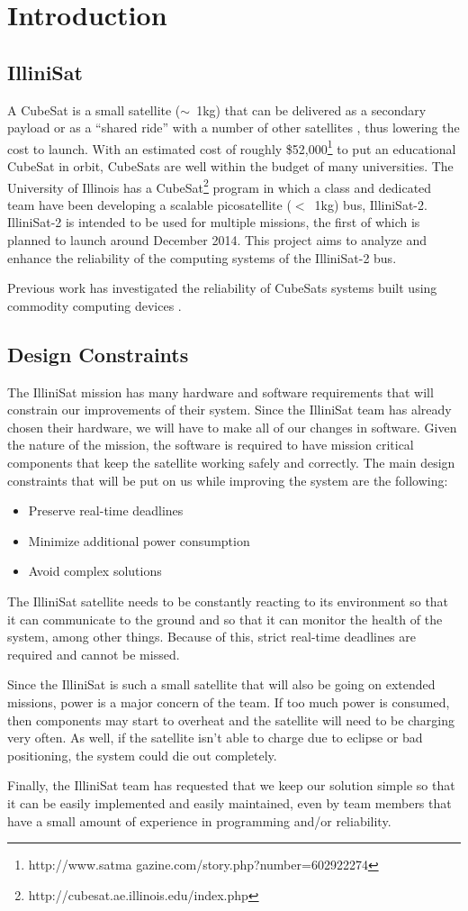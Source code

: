 \section{Introduction}
\subsection{IlliniSat}
A CubeSat is a small satellite ($\sim$~1kg) that can be delivered as a secondary
payload or as a ``shared ride'' with a number of other satellites , thus
lowering the cost to launch\cite{toorian2008cubesat}.  With an estimated cost of
roughly \$52,000\footnote{http://www.satma gazine.com/story.php?number=602922274}
to put an educational CubeSat in orbit, CubeSats are well within the budget of
many universities.  The University of Illinois has a
CubeSat\footnote{http://cubesat.ae.illinois.edu/index.php} program in which a
class and dedicated team have been developing a scalable picosatellite ($<$~1kg)
bus, IlliniSat-2.  IlliniSat-2 is intended to be used for multiple missions, the
first of which is planned to launch around December 2014.  This project aims to
analyze and enhance the reliability of the computing systems of the IlliniSat-2
bus.

Previous work has investigated the reliability of CubeSats systems built using
commodity computing devices \cite{odegaard2013error}.
\subsection{Design Constraints}
The IlliniSat mission has many hardware and software requirements that will constrain our improvements of their system. Since the IlliniSat team has already chosen their hardware, we will have to make all of our changes in software. Given the nature of the mission, the software is required to have mission critical components that keep the satellite working safely and correctly. The main design constraints that will be put on us while improving the system are the following:
\begin{itemize}
  \item Preserve real-time deadlines
  \item Minimize additional power consumption
  \item Avoid complex solutions
\end{itemize}
The IlliniSat satellite needs to be constantly reacting to its environment so that it can communicate to the ground and so that it can monitor the health of the system, among other things. Because of this, strict real-time deadlines are required and cannot be missed. 

Since the IlliniSat is such a small satellite that will also be going on extended missions, power is a major concern of the team. If too much power is consumed, then components may start to overheat and the satellite will need to be charging very often. As well, if the satellite isn't able to charge due to eclipse or bad positioning, the system could die out completely.

Finally, the IlliniSat team has requested that we keep our solution simple so that it can be easily implemented and easily maintained, even by team members that have a small amount of experience in programming and/or reliability. 